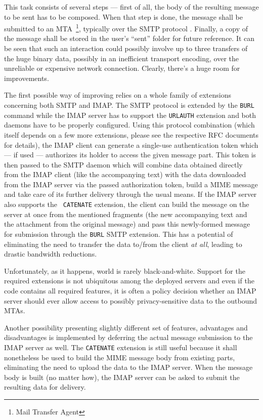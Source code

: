 \documentclass[trojita]{subfiles}
\begin{document}

This task consists of several steps --- first of all, the body of the resulting message to be sent has to be composed.
When that step is done, the message shall be submitted to an MTA~\footnote{Mail Transfer Agent}, typically over the SMTP
protocol \cite{rfc6409}.  Finally, a copy of the message shall be stored in the user's ``sent'' folder for future
reference.  It can be seen that such an interaction could possibly involve up to three transfers of the huge binary
data, possibly in an inefficient transport encoding, over the unreliable or expensive network connection.  Clearly,
there's a huge room for improvements.

The first possible way of improving relies on a whole family of extensions concerning both SMTP and IMAP.  The SMTP
protocol is extended by the {\tt BURL} command \cite{rfc4468} while the IMAP server has to support the {\tt URLAUTH}
extension \cite{rfc4467} and both daemons have to be properly configured.  Using this protocol combination (which itself
depends on a few more extensions, please see the respective RFC documents for details), the IMAP client can generate a
single-use authentication token which --- if used --- authorizes its holder to access the given message part.  This
token is then passed to the SMTP daemon which will combine data obtained directly from the IMAP client (like the
accompanying text) with the data downloaded from the IMAP server via the passed authorization token, build a MIME
message and take care of its further delivery through the usual means.  If the IMAP server also supports the {\tt
CATENATE} extension, the client can build the message on the server at once from the mentioned fragments (the new
accompanying text and the attachment from the original message) and pass this newly-formed message for submission
through the {\tt BURL} SMTP extension.  This has a potential of eliminating the need to transfer the data to/from the
client {\em at all}, leading to drastic bandwidth reductions.

Unfortunately, as it happens, world is rarely black-and-white.  Support for the required extensions is not ubiquitous
among the deployed servers and even if the code contains all required features, it is often a policy decision whether an
IMAP server should ever allow access to possibly privacy-sensitive data to the outbound MTAs.

Another possibility presenting slightly different set of features, advantages and disadvantages is implemented by
deferring the actual message submission to the IMAP server as well.  The {\tt CATENATE} extension is still useful
because it shall nonetheless be used to build the MIME message body from existing parts, eliminating the need to upload
the data to the IMAP server.  When the message body is built (no matter how), the IMAP server can be asked to submit the
resulting data for delivery.
\end{document}
